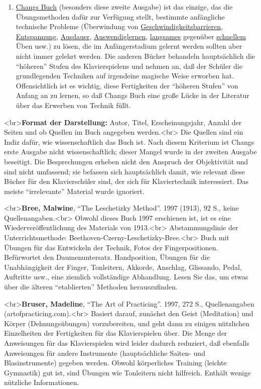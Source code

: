 \begin{enumerate}[label={\arabic*.}]
\item \hyperref[Chang]{Changs Buch} (besonders diese zweite Ausgabe) ist das einzige, das die Übungsmethoden dafür zur Verfügung stellt, bestimmte anfängliche technische Probleme (Überwindung von \hyperref[c1iv2b]{Geschwindigkeitsbarrieren}, \hyperref[c1ii14]{Entspannung}, \hyperref[c1ii21]{Ausdauer}, \hyperref[c1iii6]{Auswendiglernen}, \hyperref[c1iii6h]{langsames} gegenüber \hyperref[c1ii13]{schnellem} Üben usw.) zu lösen, die im Anfängerstadium gelernt werden sollten aber nicht immer gelehrt werden.
Die anderen Bücher behandeln hauptsächlich die \enquote{höheren} Stufen des Klavierspielens und nehmen an, daß der Schüler die grundlegenden Techniken auf irgendeine magische Weise erworben hat.
Offensichtlich ist es wichtig, diese Fertigkeiten der \enquote{höheren Stufen} von Anfang an zu lernen, so daß Changs Buch eine große Lücke in der Literatur über das Erwerben von Technik füllt.

 \end{enumerate}
<br>\textbf{Format der Darstellung:} Autor, Titel, Erscheinungsjahr, Anzahl der Seiten und ob Quellen im Buch angegeben werden.<br>
Die Quellen sind ein Indiz dafür, wie wissenschaftlich das Buch ist.
Nach diesem Kriterium ist Changs erste Ausgabe nicht wissenschaftlich; dieser Mangel wurde in der zweiten Ausgabe beseitigt.
Die Besprechungen erheben nicht den Anspruch der Objektivität und sind nicht umfassend; sie befassen sich hauptsächlich damit, wie relevant diese Bücher für den Klavierschüler sind, der sich für Klaviertechnik interessiert.
Das meiste \enquote{irrelevante} Material wurde ignoriert.


\label{Bree}

<br>\textbf{Bree, Malwine}, \enquote{The Leschetizky Method}. 1997 (1913), 92 S., keine Quellenangaben.<br>
Obwohl dieses Buch 1997 erschienen ist, ist es eine Wiederveröffentlichung des Materials von 1913.<br>
Abstammungslinie der Unterrichtsmethode: Beethoven-Czerny-Leschetizky-Bree.<br>  Buch mit Übungen für das Entwickeln der Technik, Fotos der Fingerpositionen.
Befürwortet den Daumenuntersatz.
Handposition, Übungen für die Unabhängigkeit der Finger, Tonleitern, Akkorde, Anschlag, Glissando, Pedal, Auftritte usw., eine ziemlich vollständige Abhandlung.
Lesen Sie das, um etwas über die älteren \enquote{etablierten} Methoden herauszufinden.


\label{Bruser}

<br>\textbf{Bruser, Madeline}, \enquote{The Art of Practicing}. 1997, 272 S., Quellenangaben (artofpracticing.com).<br>
Basiert darauf, zunächst den Geist (Meditation) und Körper (Dehnungsübungen) vorzubereiten, und geht dann zu einigen nützlichen Einzelheiten der Fertigkeiten für das Klavierspielen über.
Die Menge der Anweisungen für das Klavierspielen wird leider dadurch reduziert, daß ebenfalls Anweisungen für andere Instrumente (hauptsächliche Saiten- und Blasinstrumente) gegeben werden.
Obwohl körperliches Training (leichte Gymnastik) gut ist, sind Übungen wie Tonleitern nicht hilfreich.
Enthält wenige nützliche Informationen.



